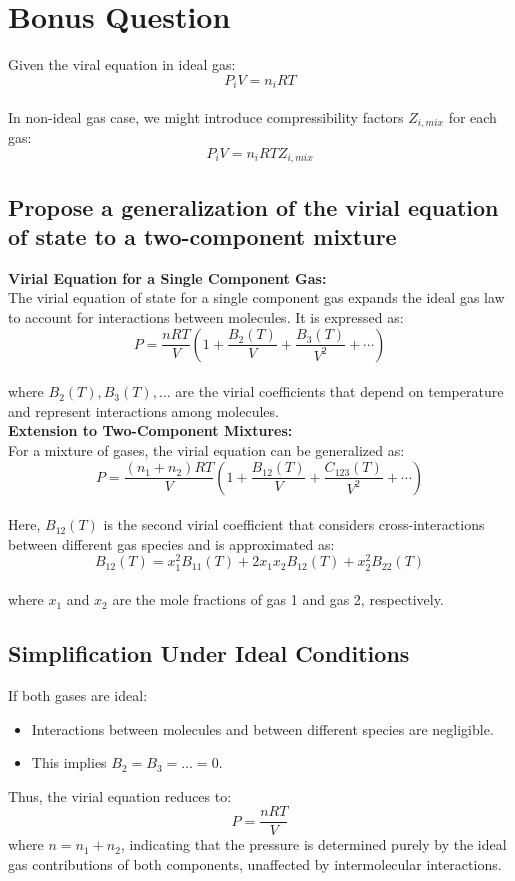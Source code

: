\documentclass{article}
\begin{document}
\section*{Bonus Question}
Given the viral equation in ideal gas:
\[ P_i V = n_i R T \]
\\
In non-ideal gas case, we might introduce compressibility factors $Z_{i, mix}$ for each gas:
\[ P_i V = n_i R T Z_{i, mix} \]

\subsection*{Propose a generalization of the virial equation of state to a two-component mixture}

\textbf{Virial Equation for a Single Component Gas: }
\\
The virial equation of state for a single component gas expands the ideal gas law to account for interactions between molecules. It is expressed as:
\[ P = \frac{nRT}{V} \left(1 + \frac{B_2(T)}{V} + \frac{B_3(T)}{V^2} + \cdots \right) \]
\\
where \( B_2(T), B_3(T), \ldots \) are the virial coefficients that depend on temperature and represent interactions among molecules.
\\
\textbf{Extension to Two-Component Mixtures: }
\\
For a mixture of gases, the virial equation can be generalized as:
\[ P = \frac{(n_1+n_2)RT}{V} \left(1 + \frac{B_{12}(T)}{V} + \frac{C_{123}(T)}{V^2} + \cdots \right) \]
\\
Here, \( B_{12}(T) \) is the second virial coefficient that considers cross-interactions between different gas species and is approximated as:
\[ B_{12}(T) = x_1^2 B_{11}(T) + 2x_1x_2 B_{12}(T) + x_2^2 B_{22}(T) \]
\\
where \( x_1 \) and \( x_2 \) are the mole fractions of gas 1 and gas 2, respectively.

\subsection*{Simplification Under Ideal Conditions}
If both gases are ideal:
\begin{itemize}
    \item Interactions between molecules and between different species are negligible.
    \item This implies \( B_2 = B_3 = \ldots = 0 \).
\end{itemize}

Thus, the virial equation reduces to:
\[ P = \frac{nRT}{V} \]
where \( n = n_1 + n_2 \), indicating that the pressure is determined purely by the ideal gas contributions of both components, unaffected by intermolecular interactions.
\end{document}
